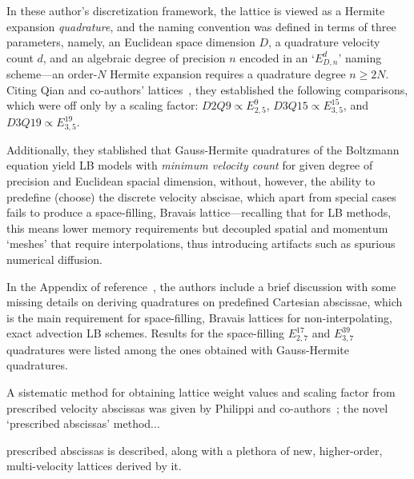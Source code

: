     In these author's discretization framework, the lattice is viewed as a Hermite expansion \emph{quadrature}, and  the  naming
    convention was defined in terms of three parameters, namely, an Euclidean space dimension $D$, a quadrature  velocity  count
    $d$, and an algebraic degree of precision $n$ encoded in an `$E_{D,n}^{d}$' naming scheme---an order-$N$  Hermite  expansion
    requires      a      quadrature      degree      $n      \geqslant      2N$.      Citing      Qian      and      co-authors'
    lattices~\cite{1992-QianYH+LallemandP-EurophysLett}, they established the following comparisons, which were off  only  by  a
    scaling factor: $D2Q9 \propto E_{2,5}^{9}$, $D3Q15 \propto E_{3,5}^{15}$, and $D3Q19 \propto E_{3,5}^{19}$.

    Additionally, they stablished that Gauss-Hermite quadratures of the Boltzmann equation yield LB  models  with  \emph{minimum
    velocity count} for given degree of precision and Euclidean spacial dimension, without, however, the  ability  to  predefine
    (choose) the discrete velocity abscisae,  which  apart  from  special  cases  fails  to  produce  a  space-filling,  Bravais
    lattice---recalling that for LB methods, this means lower memory requirements but decoupled spatial  and  momentum  `meshes'
    that require interpolations, thus introducing artifacts such as spurious numerical diffusion.

    In the Appendix of reference~\cite{2006-ShanX+ChenH-JFluidMech}, the authors include a brief discussion  with  some  missing
    details on deriving quadratures on predefined Cartesian abscissae, which is the main requirement for space-filling,  Bravais
    lattices for non-interpolating, exact advection LB schemes. Results for the space-filling $E_{2,7}^{17}$ and  $E_{3,7}^{39}$
    quadratures were listed among the ones obtained with Gauss-Hermite quadratures.


    A sistematic method for obtaining lattice weight values and scaling factor from prescribed velocity abscissas was given by
    Philippi and co-authors~\cite{2006-PhilippiPC+SurmasR-PhysRevE}; the novel `prescribed abscissas' method...

    prescribed abscissas is described, along with a plethora of new, higher-order, multi-velocity lattices derived by it.





